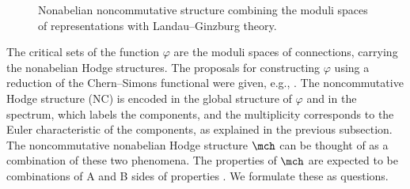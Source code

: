 \documentclass[10pt,a4paper]{amsart}
\begin{document}
\begin{figure}[ht]
	\centering
	\caption{Nonabelian noncommutative structure combining the moduli spaces of representations with Landau--Ginzburg theory.}
	\label{fig:NCNA}
\end{figure}

The critical sets of the function $\varphi$ are the moduli spaces of connections, carrying the nonabelian Hodge structures. The proposals for constructing $\varphi$ using a reduction of the Chern--Simons functional were given, e.g., \cite{EGGKPSS22,EGGKPS22}. The noncommutative Hodge structure (NC) is encoded in the global structure of $\varphi$ and in the spectrum, which labels the components, and the multiplicity corresponds to the Euler characteristic of the components, as explained in the previous subsection. The noncommutative nonabelian Hodge structure $\mch$ can be thought of as a combination of these two phenomena. The properties of $\mch$ are expected to be combinations of A and B sides of properties \cite{KKP08}. We formulate these as questions.

\end{document}
